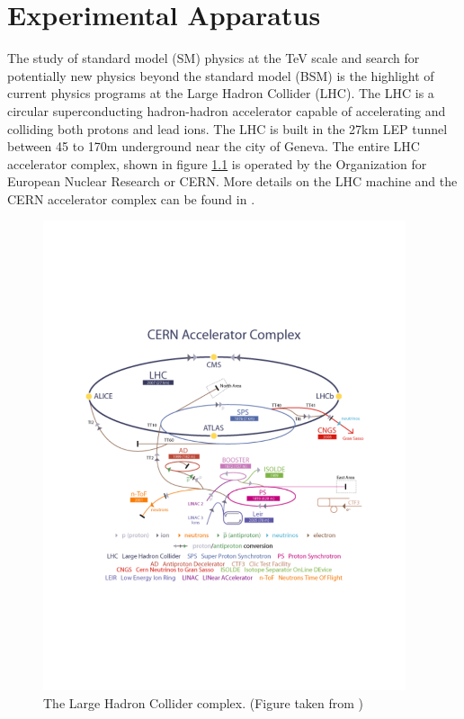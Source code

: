 \chapter{Experimental Apparatus}
\label{chap:Exp}

\indent The study of standard model (SM) physics at the TeV scale and search for potentially new physics beyond the standard model (BSM) is the highlight of current physics programs at the Large Hadron Collider (LHC).  The LHC is a circular superconducting hadron-hadron accelerator capable of accelerating and colliding both protons and lead ions.  The LHC is built in the 27km LEP tunnel between 45 to 170m underground near the city of Geneva.  The entire LHC accelerator complex, shown in figure \ref{LHC:fig:LHCComplex} is operated by the Organization for European Nuclear Research or CERN. More details on the LHC machine and the CERN accelerator complex can be found in \cite{LHC}. \\

\begin{figure}[h!]
\centering
\includegraphics[width=0.95\textwidth, angle=0]{figures/LHC_ATLAS/AccComplex0700829.pdf}
\caption{ The Large Hadron Collider complex. (Figure taken from \cite{LHC}) \label{LHC:fig:LHCComplex}}
\end{figure}


